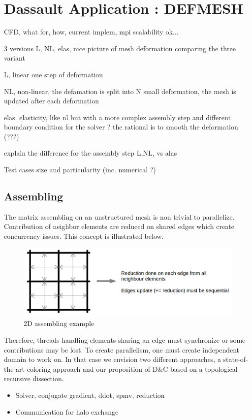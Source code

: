 \documentclass{IOS-Book-Article}
\begin{document}
\section{Dassault Application : DEFMESH}

CFD, what for, how, current implem, mpi scalability ok...

3 versions L, NL, elas, nice picture of mesh deformation comparing the three variant

L, linear one step of deformation

NL, non-linear, the defamation is split into N small deformation, the mesh is updated after each deformation

elas. elasticity, like nl but with a more complex assembly step and different boundary condition for the solver ? the rational is to smooth the deformation (???)

explain the difference for the assembly step L,NL, vs alas

Test cases size and particularity (inc. numerical ?)

\subsection{Assembling}
 The matrix assembling on an unstructured mesh is non trivial to parallelize. Contribution of neighbor elements are reduced on shared edges which create concurrency issues.
 This concept is illustrated below.
\begin{figure}[htp]
 \centering
 \label{fig0}
 \includegraphics[scale=0.2]{2D_assembly.png}
 \caption{2D assembling example}
\end{figure}

 Therefore, threads handling elements sharing an edge must synchronize or some contributions may be lost. To create parallelism, one must create independent domain to work on.
 In that case we envision two different approaches, a state-of-the-art coloring approach and our proposition of D\&C based on a topological recursive dissection.

\begin{itemize}
 \item Solver, conjugate gradient, ddot, spmv, reduction
 \item Communication for halo exchange
\end{itemize}
\end{document}
